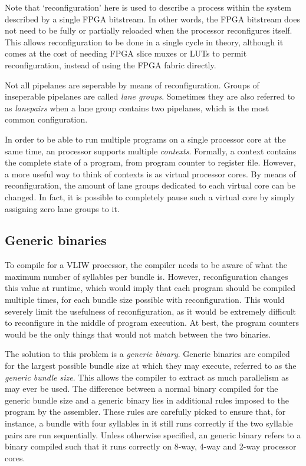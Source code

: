 Note that `reconfiguration' here is used to describe a process within the system 
described by a single FPGA bitstream. In other words, the FPGA bitstream does 
not need to be fully or partially reloaded when the \rvex{} processor 
reconfigures itself. This allows reconfiguration to be done in a single cycle in 
theory, although it comes at the cost of needing FPGA slice muxes or LUTs to 
permit reconfiguration, instead of using the FPGA fabric directly.

Not all pipelanes are seperable by means of reconfiguration. Groups of 
inseperable pipelanes are called \textit{lane groups}. Sometimes they are also 
referred to as \textit{lanepairs} when a lane group contains two pipelanes, 
which is the most common configuration.

In order to be able to run multiple programs on a single \rvex{} processor core 
at the same time, an \rvex{} processor supports multiple \textit{contexts}. 
Formally, a context contains the complete state of a program, from program 
counter to register file. However, a more useful way to think of \rvex{} 
contexts is as virtual processor cores. By means of reconfiguration, the amount 
of lane groups dedicated to each virtual core can be changed. In fact, it is 
possible to completely pause such a virtual core by simply assigning zero lane 
groups to it.

\subsection{Generic binaries}
\label{sec:core-ug-intro-gen-bin}

To compile for a VLIW processor, the compiler needs to be aware of what the 
maximum number of syllables per bundle is. However, reconfiguration changes this 
value at runtime, which would imply that each program should be compiled 
multiple times, for each bundle size possible with reconfiguration. This would 
severely limit the usefulness of reconfiguration, as it would be extremely 
difficult to reconfigure in the middle of program execution. At best, the 
program counters would be the only things that would not match between the two 
binaries.

The solution to this problem is a \textit{generic binary}. Generic binaries are compiled for the 
largest possible bundle size at which they may execute, referred to as the 
\textit{generic bundle size}. This allows the compiler to extract as much 
parallelism as may ever be used. The difference between a normal binary compiled 
for the generic bundle size and a generic binary lies in additional rules 
imposed to the program by the assembler. These rules are carefully picked to 
ensure that, for instance, a bundle with four syllables in it still runs 
correctly if the two syllable pairs are run sequentially. Unless otherwise 
specified, an \rvex{} generic binary refers to a binary compiled such that it 
runs correctly on 8-way, 4-way and 2-way \rvex{} processor cores.

